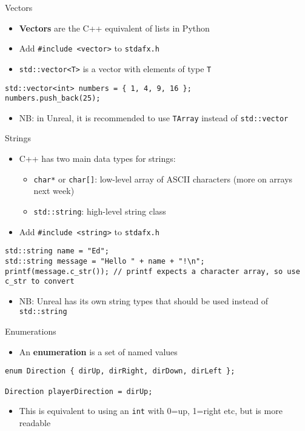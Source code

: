 \begin{frame}[fragile]{Vectors}
	\begin{itemize}
		\item \textbf{Vectors} are the C++ equivalent of lists in Python
		\pause
		\item Add \lstinline{#include <vector>} to \texttt{stdafx.h}
		\pause
		\item \lstinline{std::vector<T>} is a vector with elements of type \lstinline{T}
	\end{itemize}
	\pause
	\begin{lstlisting}
std::vector<int> numbers = { 1, 4, 9, 16 };
numbers.push_back(25);
	\end{lstlisting}
	\begin{itemize}
		\pause\item NB: in Unreal, it is recommended to use \lstinline{TArray} instead of \lstinline{std::vector}
	\end{itemize}
\end{frame}

\begin{frame}[fragile]{Strings}
	\begin{itemize}
		\item C++ has two main data types for strings:
		\begin{itemize}
			\item \lstinline{char*} or \lstinline{char[]}: low-level array of ASCII characters (more on arrays next week)
			\item \lstinline{std::string}: high-level string class
		\end{itemize}
		\pause\item Add \lstinline{#include <string>} to \texttt{stdafx.h}
	\end{itemize}
	\pause
	\begin{lstlisting}
std::string name = "Ed";
std::string message = "Hello " + name + "!\n";
printf(message.c_str()); // printf expects a character array, so use c_str to convert
	\end{lstlisting}
	\begin{itemize}
		\pause\item NB: Unreal has its own string types that should be used instead of \lstinline{std::string}
	\end{itemize}
\end{frame}

\begin{frame}[fragile]{Enumerations}
	\begin{itemize}
		\item An \textbf{enumeration} is a set of named values
	\end{itemize}
	\pause
	\begin{lstlisting}
enum Direction { dirUp, dirRight, dirDown, dirLeft };

Direction playerDirection = dirUp;
	\end{lstlisting}
	\pause
	\begin{itemize}
		\item This is equivalent to using an \lstinline{int} with 0=up, 1=right etc, but is more readable
	\end{itemize}
\end{frame}

